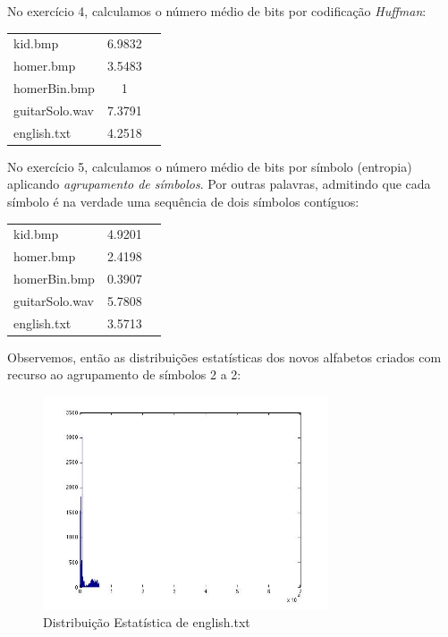 \documentclass[12pt]{article}
\begin{document}
  \pagebreak

  No exercício 4, calculamos o número médio de bits por codificação
  \textit{Huffman}:

  \begin{tabular}{ l c r }
    kid.bmp & 6.9832 \\
    homer.bmp & 3.5483 \\
    homerBin.bmp & 1 \\
    guitarSolo.wav & 7.3791 \\
    english.txt & 4.2518 \\
  \end{tabular}

  No exercício 5, calculamos o número médio de bits por símbolo (entropia)
  aplicando \textit{agrupamento de símbolos}. Por outras palavras, admitindo
  que cada símbolo é na verdade uma sequência de dois símbolos contíguos:

  \begin{tabular}{ l c r }
    kid.bmp & 4.9201 \\
    homer.bmp & 2.4198 \\
    homerBin.bmp & 0.3907 \\
    guitarSolo.wav & 5.7808 \\
    english.txt & 3.5713 \\
  \end{tabular}

  Observemos, então as distribuições estatísticas dos novos alfabetos criados
  com recurso ao agrupamento de símbolos 2 a 2:
  
  \begin{figure}[H]
    \centering
      \includegraphics[width=0.75\textwidth]{ex5kid}
    \caption{Distribuição Estatística de english.txt}
  \end{figure}
\end{document}

